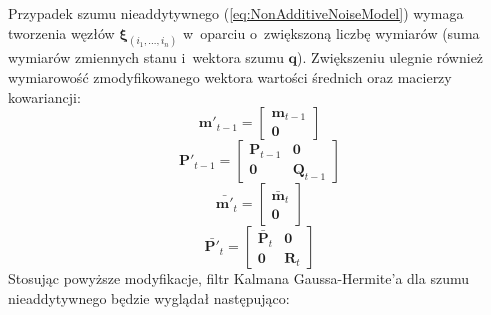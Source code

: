 Przypadek szumu nieaddytywnego (\ref{eq:NonAdditiveNoiseModel}) wymaga tworzenia węzłów $\boldsymbol{\xi}_{(i_1, \dots, i_n)}$ w~oparciu o~zwiększoną liczbę wymiarów (suma wymiarów zmiennych stanu i~wektora szumu $\boldsymbol{q}$). Zwiększeniu ulegnie również wymiarowość zmodyfikowanego wektora wartości średnich oraz macierzy kowariancji:
\begin{equation} \label{eq:NonAdditive_m_t-1}
\boldsymbol{m}'_{t-1}=
\begin{bmatrix}
\boldsymbol{m}_{t-1} \\
\boldsymbol{0}
\end{bmatrix} 
\end{equation}
\begin{equation} \label{eq:NonAdditive_P_t-1}
\boldsymbol{P}'_{t-1}=
\begin{bmatrix}
\boldsymbol{P}_{t-1} & \boldsymbol{0} \\
\boldsymbol{0} & \boldsymbol{Q}_{t-1}
\end{bmatrix} 
\end{equation}
\begin{equation} \label{eq:NonAdditive_m_t}
\bar{\boldsymbol{m}'}_{t}=
\begin{bmatrix}
\bar{\boldsymbol{m}}_{t} \\
\boldsymbol{0}
\end{bmatrix} 
\end{equation}
\begin{equation} \label{eq:NonAdditive_P_t}
\bar{\boldsymbol{P}'}_{t}=
\begin{bmatrix}
\bar{\boldsymbol{P}}_{t} & \boldsymbol{0} \\
\boldsymbol{0} & \boldsymbol{R}_{t}
\end{bmatrix} 
\end{equation}
Stosując powyższe modyfikacje, filtr Kalmana Gaussa-Hermite'a dla szumu nieaddytywnego będzie wyglądał następująco:
